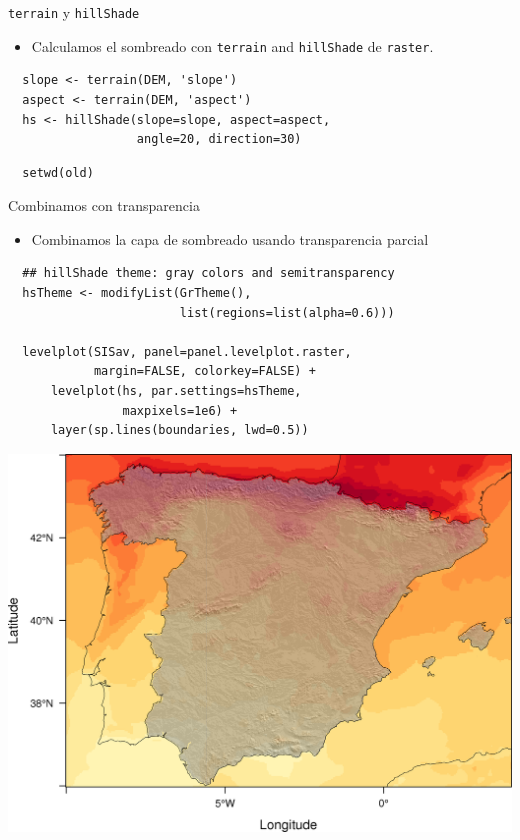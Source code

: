 \documentclass[xcolor={usenames,svgnames,dvipsnames}]{beamer}
\begin{document}
\begin{frame}[fragile,label=sec-2-3-2]{\texttt{terrain} y \texttt{hillShade}}
 \begin{itemize}
\item Calculamos el sombreado con \texttt{terrain} and \texttt{hillShade} de \texttt{raster}.
\end{itemize}

\lstset{language=R,label= ,caption= ,numbers=none}
\begin{lstlisting}
  slope <- terrain(DEM, 'slope')
  aspect <- terrain(DEM, 'aspect')
  hs <- hillShade(slope=slope, aspect=aspect,
                  angle=20, direction=30)
\end{lstlisting}

\lstset{language=R,label= ,caption= ,numbers=none}
\begin{lstlisting}
  setwd(old)
\end{lstlisting}
\end{frame}

\begin{frame}[fragile,label=sec-2-3-3]{Combinamos con transparencia}
 \begin{itemize}
\item Combinamos la capa de sombreado usando transparencia parcial
\end{itemize}

\lstset{language=R,label= ,caption= ,numbers=none}
\begin{lstlisting}
  ## hillShade theme: gray colors and semitransparency
  hsTheme <- modifyList(GrTheme(),
                        list(regions=list(alpha=0.6)))
  
  levelplot(SISav, panel=panel.levelplot.raster,
            margin=FALSE, colorkey=FALSE) +
      levelplot(hs, par.settings=hsTheme,
                maxpixels=1e6) +
      layer(sp.lines(boundaries, lwd=0.5))
\end{lstlisting}
\end{frame}

\begin{frame}[label=sec-2-3-4]{}
\includegraphics[width=.9\linewidth]{figs/hillShading.png}
\end{frame}
\end{document}
